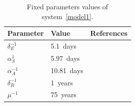 \documentclass[preprint, sort&compress]{elsarticle}
\begin{document}
\begin{table}[h!]
    \begin{center}
        \begin{tabular}{>{\centering}p{}p{}p{}}
            \toprule
            Parameter & Value & References
            \\
            \midrule
            $\delta_{E}^{-1}$ & \SI{5.1}{days}   &  \cite{Tian2020}
            \\
            $\alpha_{S}^{1}$  & \SI{5.97}{days}  &  \cite{Acuna2020}
            \\
            $\alpha_{A}^{-1}$ & \SI{10.81}{days} & \cite{Acuna2020}
            \\
            $\delta_{R}^{-1}$ & \SI{1}{years}     &
            \\
            $\mu^{-1}$        & \SI{75}{years}   &
            \\
            \bottomrule
        \end{tabular}
        \caption{
            Fixed parameters values of system~\ref{model1}.
        }
        \label{table_fixparam}
    \end{center}
\end{table}
\end{document}
